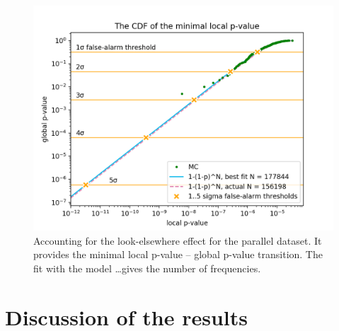 \begin{figure}
  \centering
  \includegraphics[width=\linewidth]{gfx/axions/P_look-elsewhere.png}
  \caption{Accounting for the look-elsewhere effect for the parallel dataset. It provides the minimal local p-value -- global p-value transition. The fit with the model \dots gives the number of frequencies.}
  \label{fig:P_look-elsewhere}
\end{figure}



\section{Discussion of the results}


